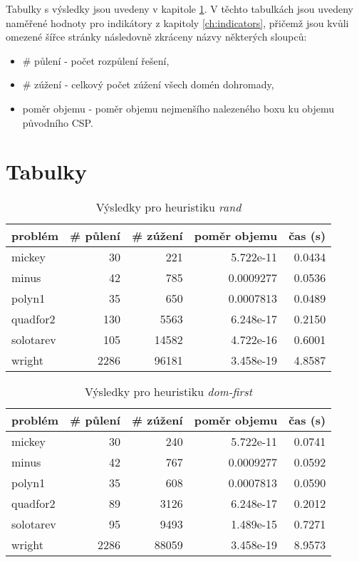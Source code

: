 {Tabulky s výsledky jsou uvedeny v kapitole \ref{ch:resultTables}. V těchto tabulkách jsou uvedeny naměřené hodnoty pro indikátory z kapitoly \ref{ch:indicators}, přičemž jsou kvůli omezené šířce stránky následovně zkráceny názvy některých sloupců:


\begin{itemize}
    \item \# půlení - počet rozpůlení řešení,
    \item \# zúžení - celkový počet zúžení všech domén dohromady,
    \item poměr objemu - poměr objemu nejmenšího nalezeného boxu ku objemu původního CSP.
\end{itemize}


\section{Tabulky}
\label{ch:resultTables}

\begin{table}[H]
\centering
\begin{tabular}{lrrrr}
\hline
problém & \# půlení & \# zúžení & poměr objemu & čas (s) \\ \hline
mickey & 30 & 221 & 5.722e-11 & 0.0434 \\
minus & 42 & 785 & 0.0009277 & 0.0536 \\
polyn1 & 35 & 650 & 0.0007813 & 0.0489 \\
quadfor2 & 130 & 5563 & 6.248e-17 & 0.2150 \\
solotarev & 105 & 14582 & 4.722e-16 & 0.6001 \\
wright & 2286 & 96181 & 3.458e-19 & 4.8587 \\
\end{tabular}
\caption{Výsledky pro heuristiku \emph{rand}}
\label{rand}
\end{table}



\begin{table}[H]
\centering
\begin{tabular}{lrrrr}
\hline
problém & \# půlení & \# zúžení & poměr objemu & čas (s) \\ \hline
mickey & 30 & 240 & 5.722e-11 & 0.0741 \\
minus & 42 & 767 & 0.0009277 & 0.0592 \\
polyn1 & 35 & 608 & 0.0007813 & 0.0590 \\
quadfor2 & 89 & 3126 & 6.248e-17 & 0.2012 \\
solotarev & 95 & 9493 & 1.489e-15 & 0.7271 \\
wright & 2286 & 88059 & 3.458e-19 & 8.9573 \\
\end{tabular}
\caption{Výsledky pro heuristiku \emph{dom-first}}
\label{dom-first}
\end{table}



}
